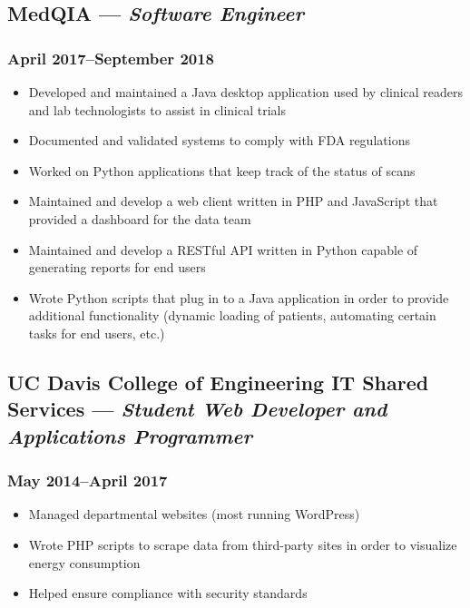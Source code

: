 \documentclass{article}
\begin{document}
\begin{minipage}[t]{.6\textwidth}
\subsection*{MedQIA --- \textit{Software Engineer}}
\subsubsection*{April 2017--September 2018}
\begin{itemize}
    \item Developed and maintained a Java desktop application used by clinical readers and lab technologists to assist in clinical trials
    \item Documented and validated systems to comply with FDA regulations
    \item Worked on Python applications that keep track of the status of scans
    \item Maintained and develop a web client written in PHP and JavaScript that provided a dashboard for the data team
    \item Maintained and develop a RESTful API written in Python capable of generating reports for end users
    \item Wrote Python scripts that plug in to a Java application in order to provide additional functionality (dynamic loading of patients, automating certain tasks for end users, etc.)
\end{itemize}
\subsection*{UC Davis College of Engineering IT Shared Services --- \textit{Student Web Developer and Applications Programmer}}
\subsubsection*{May 2014--April 2017}
\begin{itemize}
    \item Managed departmental websites (most running WordPress)
    \item Wrote PHP scripts to scrape data from third-party sites in order to visualize energy consumption
    \item Helped ensure compliance with security standards
\end{itemize}
\end{minipage}
\hspace{0.08\textwidth}
\end{document}
